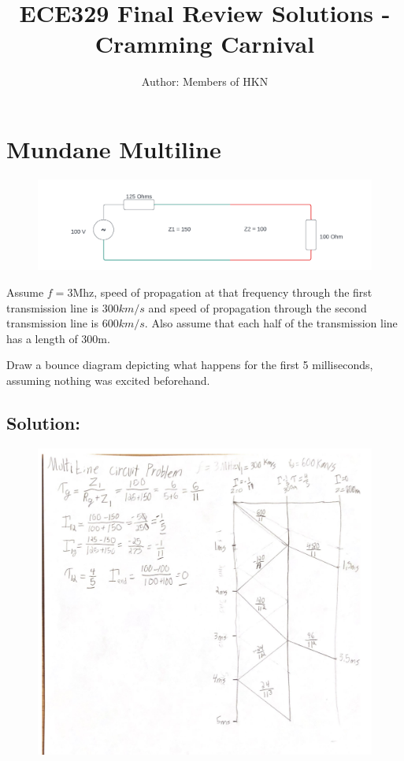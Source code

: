 \documentclass{article}
\title{ECE329 Final Review Solutions - Cramming Carnival}
\author{Author: Members of HKN}
\date{}
\begin{document}
\maketitle

\section{Mundane Multiline}

\begin{figure}[h]
\begin{center}
    \includegraphics[width=
    \textwidth]{figures/Multiline_Example.png}
\end{center}
\end{figure}

Assume $f = 3$Mhz, speed of propagation at that frequency through the first transmission line is $300 km/s$ and speed of propagation through the second transmission line is $600 km/s$. Also assume that each half of the transmission line has a length of 300m.

Draw a bounce diagram depicting what happens for the first 5 milliseconds, assuming nothing was excited beforehand.

\subsection{Solution:}

\begin{figure}[H]
\begin{center}
    \includegraphics[width=
    \textwidth]{figures/Multiline_Solution.jpg}
\end{center}
\end{figure}
\end{document}
